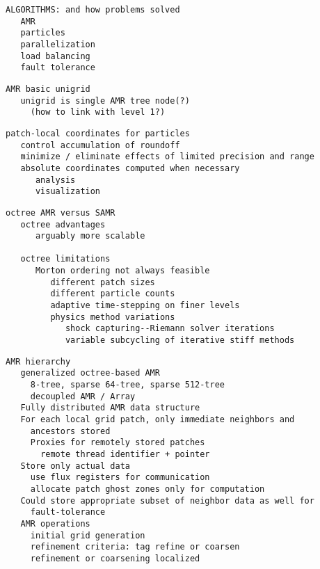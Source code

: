 \documentclass[14pt,letter]{article}
\begin{document}
\begin{verbatim}
ALGORITHMS: and how problems solved
   AMR
   particles
   parallelization
   load balancing
   fault tolerance
\end{verbatim}

\begin{verbatim}
AMR basic unigrid
   unigrid is single AMR tree node(?)
     (how to link with level 1?)
\end{verbatim}

\begin{verbatim}
patch-local coordinates for particles
   control accumulation of roundoff
   minimize / eliminate effects of limited precision and range
   absolute coordinates computed when necessary
      analysis
      visualization
\end{verbatim}

\begin{verbatim}
octree AMR versus SAMR   
   octree advantages
      arguably more scalable

   octree limitations
      Morton ordering not always feasible
         different patch sizes
         different particle counts
         adaptive time-stepping on finer levels
         physics method variations
            shock capturing--Riemann solver iterations
            variable subcycling of iterative stiff methods
\end{verbatim}

\begin{verbatim}
AMR hierarchy
   generalized octree-based AMR 
     8-tree, sparse 64-tree, sparse 512-tree
     decoupled AMR / Array
   Fully distributed AMR data structure
   For each local grid patch, only immediate neighbors and
     ancestors stored
     Proxies for remotely stored patches
       remote thread identifier + pointer
   Store only actual data
     use flux registers for communication
     allocate patch ghost zones only for computation
   Could store appropriate subset of neighbor data as well for
     fault-tolerance
   AMR operations
     initial grid generation
     refinement criteria: tag refine or coarsen
     refinement or coarsening localized
\end{verbatim}
\end{document}
